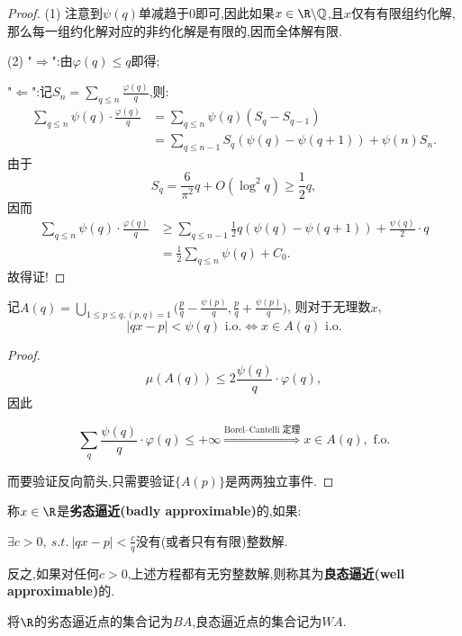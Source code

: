 \begin{proof}
    (1)
    注意到$\psi(q)$单减趋于$0$即可,因此如果$x\in \R\backslash \Q$,且$x$仅有有限组约化解,
    那么每一组约化解对应的非约化解是有限的,因而全体解有限.

    (2)
    "$\Rightarrow$":由$\varphi(q)\leq q$即得;

    "$\Leftarrow$":记$\displaystyle S_n = \sum_{q\leq n} \frac{\varphi(q)}{q}$,则:
    \begin{align*}
        \sum_{q\leq n} \psi(q)\cdot \frac{\varphi(q)}{q} &= \sum_{q\leq n} \psi(q)(S_q-S_{q-1})
        \\ &= \sum_{q\leq n-1} S_q(\psi(q) - \psi(q+1)) + \psi(n)S_n.
    \end{align*}
    由于\[S_q = \frac{6}{\pi^2} q + O(\log^2q) \geq \frac{1}{2}q,\]
    因而
    \begin{align*}
        \sum_{q\leq n} \psi(q)\cdot \frac{\varphi(q)}{q}
        &\geq \sum_{q\leq n-1}\frac{1}{2}q(\psi(q)-\psi(q+1))+\frac{\psi(q)}{2}\cdot q \\
        &= \frac{1}{2}\sum_{q \leq n} \psi(q) + C_0.
    \end{align*}
    故得证!
\end{proof}
\begin{theorem}

    记$A(q) = \displaystyle \bigcup_{1\leq p \leq q, (p,q) = 1}\Big(\frac{p}{q}-\frac{\psi(p)}{q},\frac{p}{q}+\frac{\psi(p)}{q}\Big)$,
    则对于无理数$x$, 
    \[|qx-p| < \psi(q) \text{ i.o.} \Longleftrightarrow    x\in A(q) \text{ i.o.}\]
\end{theorem}

\begin{proof}
    \[\mu(A(q)) \leq 2 \frac{\psi(q)}{q}\cdot \varphi(q),\]因此
    
    \[\sum_{q} \frac{\psi(q)}{q} \cdot \varphi(q) \leq +\infty \stackrel{\text{Borel--Cantelli 定理}}{\Longrightarrow} x\in A(q), \text{ f.o.}\]

    而要验证反向箭头,只需要验证$\{A(p)\}$是两两独立事件.
\end{proof}
\begin{definition}
    称$x\in \R$是\textbf{劣态逼近(badly approximable)}的,如果:

    $\exists c > 0, \ s.t.  \ |qx-p| < \frac cq $没有(或者只有有限)整数解.

    反之,如果对任何$c>0$,上述方程都有无穷整数解,则称其为\textbf{良态逼近(well approximable)}的.
    
    将$\R$的劣态逼近点的集合记为$BA$,良态逼近点的集合记为$WA$.
\end{definition}

